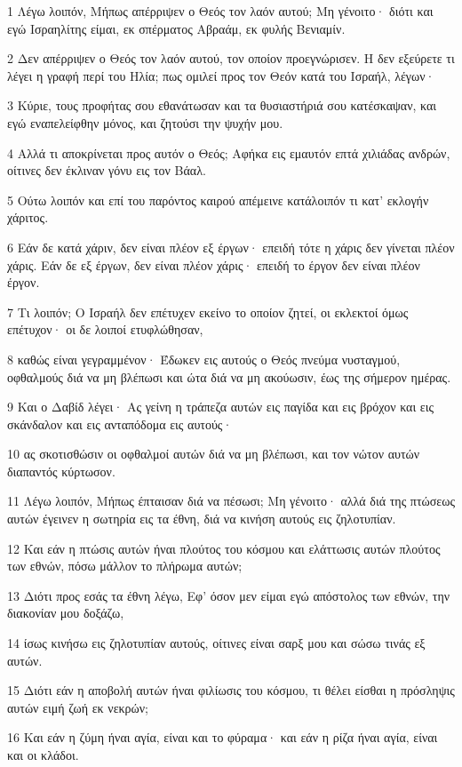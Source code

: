 \par 1 Λέγω λοιπόν, Μήπως απέρριψεν ο Θεός τον λαόν αυτού; Μη γένοιτο· διότι και εγώ Ισραηλίτης είμαι, εκ σπέρματος Αβραάμ, εκ φυλής Βενιαμίν.
\par 2 Δεν απέρριψεν ο Θεός τον λαόν αυτού, τον οποίον προεγνώρισεν. Η δεν εξεύρετε τι λέγει η γραφή περί του Ηλία; πως ομιλεί προς τον Θεόν κατά του Ισραήλ, λέγων·
\par 3 Κύριε, τους προφήτας σου εθανάτωσαν και τα θυσιαστήριά σου κατέσκαψαν, και εγώ εναπελείφθην μόνος, και ζητούσι την ψυχήν μου.
\par 4 Αλλά τι αποκρίνεται προς αυτόν ο Θεός; Αφήκα εις εμαυτόν επτά χιλιάδας ανδρών, οίτινες δεν έκλιναν γόνυ εις τον Βάαλ.
\par 5 Ούτω λοιπόν και επί του παρόντος καιρού απέμεινε κατάλοιπόν τι κατ' εκλογήν χάριτος.
\par 6 Εάν δε κατά χάριν, δεν είναι πλέον εξ έργων· επειδή τότε η χάρις δεν γίνεται πλέον χάρις. Εάν δε εξ έργων, δεν είναι πλέον χάρις· επειδή το έργον δεν είναι πλέον έργον.
\par 7 Τι λοιπόν; Ο Ισραήλ δεν επέτυχεν εκείνο το οποίον ζητεί, οι εκλεκτοί όμως επέτυχον· οι δε λοιποί ετυφλώθησαν,
\par 8 καθώς είναι γεγραμμένον· Έδωκεν εις αυτούς ο Θεός πνεύμα νυσταγμού, οφθαλμούς διά να μη βλέπωσι και ώτα διά να μη ακούωσιν, έως της σήμερον ημέρας.
\par 9 Και ο Δαβίδ λέγει· Ας γείνη η τράπεζα αυτών εις παγίδα και εις βρόχον και εις σκάνδαλον και εις ανταπόδομα εις αυτούς·
\par 10 ας σκοτισθώσιν οι οφθαλμοί αυτών διά να μη βλέπωσι, και τον νώτον αυτών διαπαντός κύρτωσον.
\par 11 Λέγω λοιπόν, Μήπως έπταισαν διά να πέσωσι; Μη γένοιτο· αλλά διά της πτώσεως αυτών έγεινεν η σωτηρία εις τα έθνη, διά να κινήση αυτούς εις ζηλοτυπίαν.
\par 12 Και εάν η πτώσις αυτών ήναι πλούτος του κόσμου και ελάττωσις αυτών πλούτος των εθνών, πόσω μάλλον το πλήρωμα αυτών;
\par 13 Διότι προς εσάς τα έθνη λέγω, Εφ' όσον μεν είμαι εγώ απόστολος των εθνών, την διακονίαν μου δοξάζω,
\par 14 ίσως κινήσω εις ζηλοτυπίαν αυτούς, οίτινες είναι σαρξ μου και σώσω τινάς εξ αυτών.
\par 15 Διότι εάν η αποβολή αυτών ήναι φιλίωσις του κόσμου, τι θέλει είσθαι η πρόσληψις αυτών ειμή ζωή εκ νεκρών;
\par 16 Και εάν η ζύμη ήναι αγία, είναι και το φύραμα· και εάν η ρίζα ήναι αγία, είναι και οι κλάδοι.
